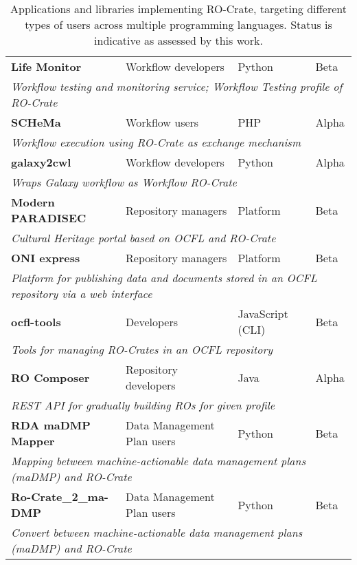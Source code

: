 \begin{table}[htbp]
\begin{tabular}{llll}
		\textbf{Life Monitor} \citep{about-lifemonitor} & Workflow developers & Python & Beta \\
		\multicolumn{4}{l}{\it Workflow testing and monitoring service; Workflow Testing profile of RO-Crate} \\
		
        \textbf{SCHeMa} \citep{arxiv:2103.13138v1} & Workflow users & PHP & Alpha \\
        \multicolumn{4}{l}{\it Workflow execution using RO-Crate as exchange mechanism} \\

		\textbf{galaxy2cwl} \citep{galaxy2cwl} & Workflow developers & Python & Alpha \\
		\multicolumn{4}{l}{\it Wraps Galaxy workflow as Workflow RO-Crate} \\

		\textbf{Modern PARADISEC} \citep{modpdsc} & Repository managers & Platform & Beta \\
		\multicolumn{4}{l}{\it Cultural Heritage portal based on OCFL and RO-Crate} \\
		
		\textbf{ONI express} \citep{arkisto-data-portal} & Repository managers & Platform & Beta \\
		\multicolumn{4}{l}{\it Platform for publishing data and documents stored in an OCFL repository via a web interface} \\
		
		\textbf{ocfl-tools} \citep{ocfl-tools} & Developers & JavaScript (CLI) & Beta \\
		\multicolumn{4}{l}{\it Tools for managing RO-Crates in an OCFL repository}\\
		
		\textbf{RO Composer} \citep{ro-composer} & Repository developers & Java & Alpha \\ 
		\multicolumn{4}{l}{\it REST API for gradually building ROs for given profile} \\
		
		\textbf{RDA maDMP Mapper} \citep{doi:10.5281/zenodo.3922136} & Data Management Plan users & Python & Beta \\
		\multicolumn{4}{l}{\it Mapping between machine-actionable data management plans (maDMP) and RO-Crate\citep{doi:10.4126/frl01-006423291} } \\

        \textbf{Ro-Crate\_2\_ma-DMP} \citep{doi:10.5281/zenodo.3903463} & Data Management Plan users & Python & Beta \\
        \multicolumn{4}{l}{\it Convert between machine-actionable data management plans (maDMP) and RO-Crate } \\
        

		\bottomrule
	\end{tabular}
	\caption{Applications and libraries implementing RO-Crate, targeting different types of users across multiple programming languages. Status is indicative as assessed by this work.}
	\label{tab:tools}
\end{table}